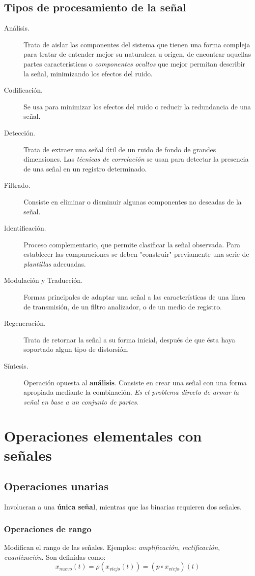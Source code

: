\documentclass[10pt,a4paper]{book}
\begin{document}
\subsection{Tipos de procesamiento de la señal}
\begin{description}
\item[Análisis.] Trata de aislar las componentes del sistema que tienen una forma compleja para tratar de entender mejor su naturaleza u origen, de encontrar aquellas partes características o \textit{componentes ocultos} que mejor permitan describir la señal, minimizando los efectos del ruido.
\item[Codificación.] Se usa para minimizar los efectos del ruido o reducir la redundancia de una señal.
\item[Detección.] Trata de extraer una señal útil de un ruido de fondo de grandes dimensiones. Las \textit{técnicas de correlación} se usan para detectar la presencia de una señal en un registro determinado.
\item[Filtrado.] Consiste en eliminar o disminuir algunas componentes no deseadas de la señal.
\item[Identificación.] Proceso complementario, que permite clasificar la señal observada. Para establecer las comparaciones se deben "construir" previamente una serie de \textit{plantillas} adecuadas.
\item[Modulación y Traducción.] Formas principales de adaptar una señal a las características de una línea de transmisión, de un filtro analizador, o de un medio de registro.
\item[Regeneración.] Trata de retornar la señal a su forma inicial, después de que ésta haya soportado algun tipo de distorsión.
\item[Síntesis.] Operación opuesta al \textbf{análisis}. Consiste en crear una señal con una forma apropiada mediante la combinación. \textit{Es el problema directo de armar la señal en base a un conjunto de partes.}
\end{description}

\section{Operaciones elementales con señales}
\subsection{Operaciones unarias}
Involucran a una \textbf{única señal}, mientras que las binarias requieren dos señales.
\subsubsection{Operaciones de rango}
Modifican el rango de las señales. Ejemplos: \textit{amplificación}, \textit{rectificación}, \textit{cuantización}. Son definidas como:
\[x_{nuevo}(t)=\rho(x_{viejo}(t))=(p\circ x_{viejo})(t)\]
\end{document}
